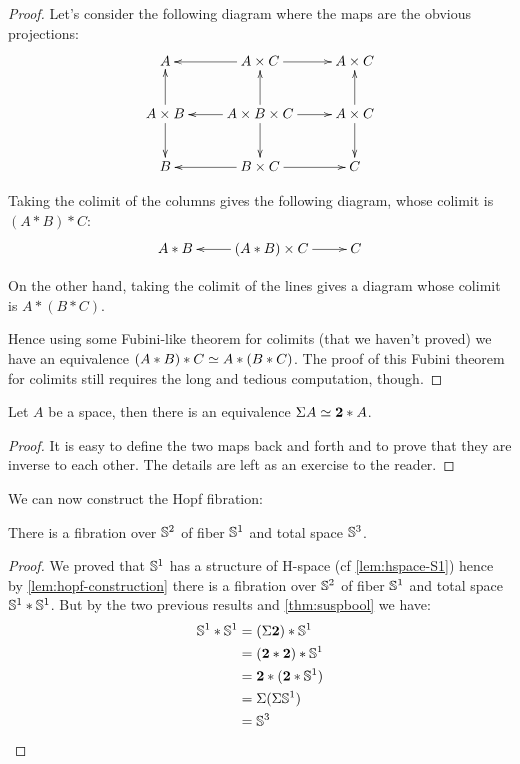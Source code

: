 \begin{proof}
  Let’s consider the following diagram where the maps are the obvious
  projections:
  \[\xymatrix{
    A & A\times C \ar[l] \ar[r] & A\times C\\
    A\times B \ar[u] \ar[d] & A\times B\times C \ar[l]\ar[u]\ar[r]\ar[d] &
    A\times C \ar[u] \ar[d] \\
    B & B\times C \ar[l] \ar[r] & C}\]

  Taking the colimit of the columns gives the following
  diagram, whose colimit is $(A*B)*C$:
  \[\xymatrix{A*B & (A*B)\times C \ar[l]\ar[r] & C}\]

  On the other hand, taking the colimit of the lines gives a diagram whose
  colimit is $A*(B*C)$.

  Hence using some Fubini-like theorem for colimits (that we haven’t proved) we
  have an equivalence $(A*B)*C \simeq A*(B*C)$. The proof of this Fubini theorem
  for colimits still requires the long and tedious computation, though.
\end{proof}

\begin{lem}
  Let $A$ be a space, then there is an equivalence $\Sigma A \simeq \mathbf{2}*A$.
\end{lem}
\begin{proof}
  It is easy to define the two maps back and forth and to prove that they are
  inverse to each other. The details are left as an exercise to the reader.
\end{proof}

We can now construct the Hopf fibration:

\begin{thm}
  There is a fibration over $\mathbb{S}^2$ of fiber $\mathbb{S}^1$ and total space $\mathbb{S}^3$.
\end{thm}
\begin{proof}
  We proved that $\mathbb{S}^1$ has a structure of H-space (cf \autoref{lem:hspace-S1})
  hence by \autoref{lem:hopf-construction} there is a fibration over $\mathbb{S}^2$ of
  fiber $\mathbb{S}^1$ and total space $\mathbb{S}^1*\mathbb{S}^1$. But by the two previous results
  and \autoref{thm:suspbool} we have:
  \begin{align*}
    \mathbb{S}^1*\mathbb{S}^1 &= (\Sigma\mathbf{2})*\mathbb{S}^1\\
    &=(\mathbf{2}*\mathbf{2})*\mathbb{S}^1\\
    &=\mathbf{2}*(\mathbf{2}*\mathbb{S}^1)\\
    &=\Sigma(\Sigma\mathbb{S}^1)\\
    &=\mathbb{S}^3
  \end{align*}
\end{proof}

